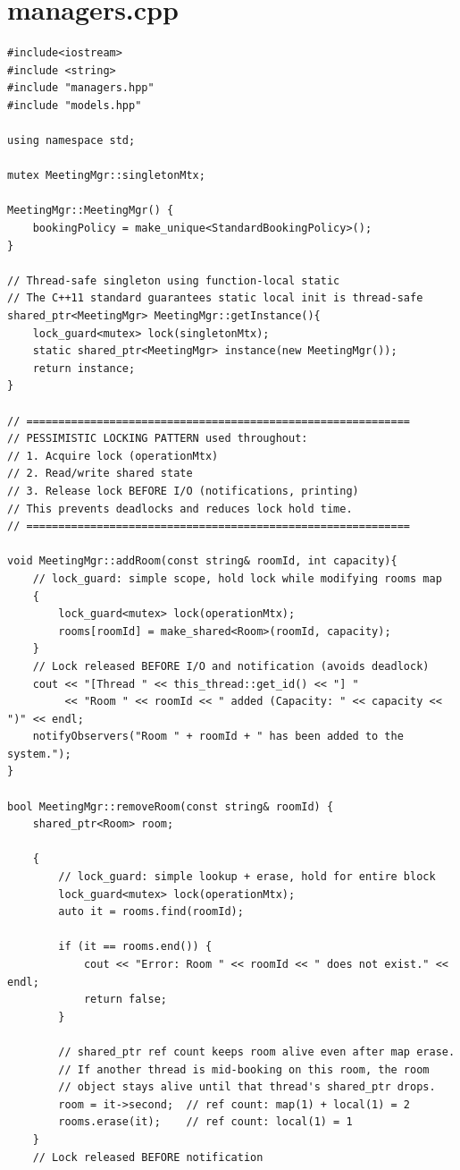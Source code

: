 \documentclass[11pt,a4paper]{article}
\begin{document}
\section{managers.cpp}
\begin{lstlisting}[title={\texttt{managers.cpp}}]
#include<iostream>
#include <string>
#include "managers.hpp"
#include "models.hpp"

using namespace std;

mutex MeetingMgr::singletonMtx;

MeetingMgr::MeetingMgr() {
    bookingPolicy = make_unique<StandardBookingPolicy>();
}

// Thread-safe singleton using function-local static
// The C++11 standard guarantees static local init is thread-safe
shared_ptr<MeetingMgr> MeetingMgr::getInstance(){
    lock_guard<mutex> lock(singletonMtx);
    static shared_ptr<MeetingMgr> instance(new MeetingMgr());
    return instance;
}

// ============================================================
// PESSIMISTIC LOCKING PATTERN used throughout:
// 1. Acquire lock (operationMtx)
// 2. Read/write shared state
// 3. Release lock BEFORE I/O (notifications, printing)
// This prevents deadlocks and reduces lock hold time.
// ============================================================

void MeetingMgr::addRoom(const string& roomId, int capacity){
    // lock_guard: simple scope, hold lock while modifying rooms map
    {
        lock_guard<mutex> lock(operationMtx);
        rooms[roomId] = make_shared<Room>(roomId, capacity);
    }
    // Lock released BEFORE I/O and notification (avoids deadlock)
    cout << "[Thread " << this_thread::get_id() << "] "
         << "Room " << roomId << " added (Capacity: " << capacity << ")" << endl;
    notifyObservers("Room " + roomId + " has been added to the system.");
}

bool MeetingMgr::removeRoom(const string& roomId) {
    shared_ptr<Room> room;
    
    {
        // lock_guard: simple lookup + erase, hold for entire block
        lock_guard<mutex> lock(operationMtx);
        auto it = rooms.find(roomId);
        
        if (it == rooms.end()) {
            cout << "Error: Room " << roomId << " does not exist." << endl;
            return false;
        }
        
        // shared_ptr ref count keeps room alive even after map erase.
        // If another thread is mid-booking on this room, the room
        // object stays alive until that thread's shared_ptr drops.
        room = it->second;  // ref count: map(1) + local(1) = 2
        rooms.erase(it);    // ref count: local(1) = 1
    }
    // Lock released BEFORE notification
    

\end{lstlisting}
\end{document}
